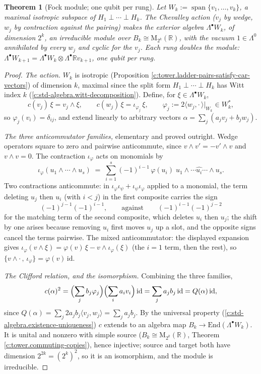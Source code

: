 \documentclass[11pt]{article}
\newtheorem{theorem}{Theorem}[section]
\theoremstyle{definition}
\theoremstyle{plain}
\newcommand{\changedmark}[2]{\marginpar{\raggedright\scriptsize\color{#1}#2}}
\providecommand{\End}{}\renewcommand{\End}{\mathrm{End}}
\providecommand{\Mat}{}\renewcommand{\Mat}{\mathrm{M}}
\providecommand{\R}{}\renewcommand{\R}{\mathbb{R}}
\begin{document}
\begin{theorem}[Fock module; one qubit per rung]\label{c:tower.fock-module-one-qubit-per-rung}
\changedmark{gray}{reworded}
Let $W_k := \operatorname{span}\{v_1, \dots, v_k\}$, a maximal isotropic subspace of $H_1 \perp \cdots \perp H_k$. The Chevalley action ($v_j$ by wedge, $w_j$ by contraction against the pairing) makes the exterior algebra $\Lambda^\bullet W_k$, of dimension $2^k$, an irreducible module over $B_k \cong \Mat_{2^k}(\R)$, with the vacuum $1 \in \Lambda^0$ annihilated by every $w_j$ and cyclic for the $v_j$. Each rung doubles the module: $\Lambda^\bullet W_{k+1} = \Lambda^\bullet W_k \otimes \Lambda^\bullet \R v_{k+1}$, one qubit per rung.
\end{theorem}
\begin{proof}
\emph{The action.} $W_k$ is isotropic (Proposition \ref{c:tower.ladder-pairs-satisfy-car-vectors}) of dimension $k$, maximal since the split form $H_1 \perp \cdots \perp H_k$ has Witt index $k$ (\ref{c:std-algebra.witt-decomposition}). Define, for $\xi \in \Lambda^\bullet W_k$,
\[
c(v_j)\,\xi = v_j \wedge \xi, \qquad c(w_j)\,\xi = \iota_{\varphi_j}\,\xi, \qquad \varphi_j := 2\langle w_j, \cdot\,\rangle|_{W_k} \in W_k^* ,
\]
so $\varphi_j(v_i) = \delta_{ij}$, and extend linearly to arbitrary vectors $\alpha = \sum_j (a_j v_j + b_j w_j)$.

\emph{The three anticommutator families,} elementary and proved outright. Wedge operators square to zero and pairwise anticommute, since $v \wedge v' = -v' \wedge v$ and $v \wedge v = 0$. The contraction $\iota_\varphi$ acts on monomials by
\[
\iota_\varphi(u_1 \wedge \cdots \wedge u_s) \;=\; \sum_{i=1}^{s} (-1)^{i-1}\, \varphi(u_i)\; u_1 \wedge \cdots \widehat{u_i} \cdots \wedge u_s .
\]
Two contractions anticommute: in $\iota_\varphi \iota_\psi + \iota_\psi \iota_\varphi$ applied to a monomial, the term deleting $u_j$ then $u_i$ (with $i < j$) in the first composite carries the sign
\[
(-1)^{j-1}(-1)^{i-1},
\qquad \text{against} \qquad
(-1)^{i-1}(-1)^{j-2}
\]
for the matching term of the second composite, which deletes $u_i$ then $u_j$; the shift by one arises because removing $u_i$ first moves $u_j$ up a slot, and the opposite signs cancel the terms pairwise. The mixed anticommutator: the displayed expansion gives $\iota_\varphi(v \wedge \xi) = \varphi(v)\,\xi - v \wedge \iota_\varphi(\xi)$ (the $i = 1$ term, then the rest), so $\{v \wedge \cdot\,,\, \iota_\varphi\} = \varphi(v)\,\mathrm{id}$.

\emph{The Clifford relation, and the isomorphism.} Combining the three families,
\[
c(\alpha)^2 = \Bigl(\sum_j b_j \varphi_j\Bigr)\Bigl(\sum_i a_i v_i\Bigr)\,\mathrm{id} = \sum_j a_j b_j\,\mathrm{id} = Q(\alpha)\,\mathrm{id},
\]
since $Q(\alpha) = \sum_j 2 a_j b_j \langle v_j, w_j\rangle = \sum_j a_j b_j$. By the universal property (\ref{c:std-algebra.existence-uniqueness}) $c$ extends to an algebra map $B_k \to \End(\Lambda^\bullet W_k)$. It is unital and nonzero with simple source ($B_k \cong \Mat_{2^k}(\R)$, Theorem \ref{c:tower.commuting-copies}), hence injective; source and target both have dimension $2^{2k} = (2^k)^2$, so it is an isomorphism, and the module is irreducible.


\end{proof}
\end{document}
